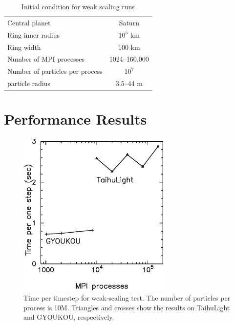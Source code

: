 \documentclass[conference]{IEEEtran}
\begin{document}
\begin{table}
\centering
 \caption{Initial condition for weak scaling runs}
 \label{tab:initialcoditions}
 \begin{tabular}{lc}
\hline
   Central planet & Saturn\\
   Ring inner radius & $10^5$ km\\
   Ring width        & $100$ km\\
   Number of MPI processes & 1024--160,000 \\
   Number of particles per process & $10^7$  \\
   particle radius & 3.5--44 m\\
\hline
\end{tabular}
\end{table}


  
  \section{Performance Results}


\begin{figure}
\includegraphics[width=3in]{weak_scaling2}
\caption{Time per timestep for weak-scaling test. The number of
  particles per process is 10M. Triangles and crosses  show the
  results on TaihuLight and GYOUKOU, respectively.
}
\label{fig:weak}
\end{figure}
\end{document}
